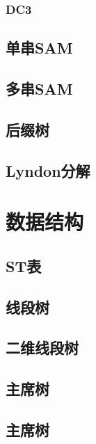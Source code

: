 \documentclass[10pt,a4paper]{article}
\begin{document}
\subsubsection{DC3}

\subsection{单串SAM}
\begin{spacing}{1.5}

\end{spacing}

\subsection{多串SAM}
\begin{spacing}{1.5}

\end{spacing}

\subsection{后缀树}

\subsection{Lyndon分解}
\begin{spacing}{1.5}

\end{spacing}

\section{数据结构}
\subsection{ST表}

\subsection{线段树}

\subsection{二维线段树}

\subsection{主席树}

\subsection{主席树}

\end{document}
